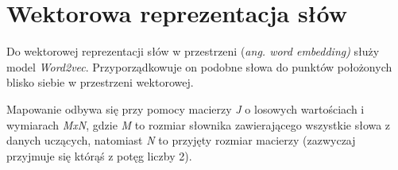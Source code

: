 \section{Wektorowa reprezentacja słów}
\label{sec:vector}

Do wektorowej reprezentacji słów w przestrzeni (\textit{ang. word embedding)} służy model \textit{Word2vec}. Przyporządkowuje on podobne słowa do punktów położonych blisko siebie w przestrzeni wektorowej\cite{word2vec}. 

Mapowanie odbywa się przy pomocy macierzy \textit{J}  o losowych wartościach i wymiarach  \textit{MxN}, gdzie \textit{M} to rozmiar słownika zawierającego wszystkie słowa z danych uczących, natomiast \textit{N} to przyjęty rozmiar macierzy (zazwyczaj przyjmuje się którąś z potęg liczby 2).   